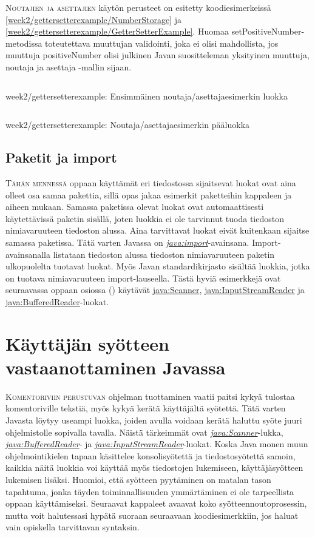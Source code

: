 \documentclass[openany]{book}
\newcommand{\newthought}[1]{\smallskip\textsc{#1}}
\newcommand{\java}[1]{\underline{\gls{java:#1}}}
\newcommand{\newjava}[1]{\textit{\java{#1}}}
\newcommand{\code}[3]{
	\begin{listing}
		\linespread{0.85}
		\inputminted{java}{OhjelmointiopasEsimerkit/src/#1/#2.java}
		\caption{#1: #3}
		\label{#1/#2}
	\end{listing}
}
\begin{document}
\newthought{Noutajien ja asettajien} käytön perusteet on esitetty koodiesimerkeissä
\ref{week2/gettersetterexample/NumberStorage} ja
\ref{week2/gettersetterexample/GetterSetterExample}. Huomaa setPositiveNumber-metodissa
toteutettava muuttujan validointi, joka ei olisi mahdollista, jos muuttuja positiveNumber olisi
julkinen Javan suositteleman yksityinen muuttuja, noutaja ja asettaja -mallin sijaan.

\code{week2/gettersetterexample}{NumberStorage}{Ensimmäinen noutaja/asettajaesimerkin luokka}
\code{week2/gettersetterexample}{GetterSetterExample}{Noutaja/asettajaesimerkin pääluokka}

\subsection{Paketit ja import}
\label{import}

\newthought{Tähän mennessä} oppaan käyttämät eri tiedostossa sijaitsevat luokat ovat aina olleet
osa samaa pakettia, sillä opas jakaa esimerkit paketteihin kappaleen ja aiheen mukaan. Samassa
paketissa olevat luokat ovat automaattisesti käytettävissä paketin sisällä, joten luokkia ei ole
tarvinnut tuoda tiedoston nimiavaruuteen tiedoston alussa. Aina tarvittavat luokat eivät
kuitenkaan sijaitse samassa paketissa. Tätä varten Javassa on \newjava{import}-avainsana.
Import-avainsanalla listataan tiedoston alussa tiedoston nimiavaruuteen paketin ulkopuolelta
tuotavat luokat. Myös Javan standardikirjasto sisältää luokkia, jotka on tuotava nimiavaruuteen
import-lauseella. Tästä hyviä esimerkkejä ovat seuraavassa oppaan osiossa ()
käytävät \java{Scanner}, \java{InputStreamReader} ja \java{BufferedReader}-luokat.


\section{Käyttäjän syötteen vastaanottaminen Javassa}
\label{input}

\newthought{Komentoriviin perustuvan} ohjelman tuottaminen vaatii paitsi kykyä tulostaa
komentoriville tekstiä, myös kykyä kerätä käyttäjältä syötettä. Tätä varten Javasta löytyy
useampi luokka, joiden avulla voidaan kerätä haluttu syöte juuri ohjelmistolle sopivalla tavalla.
Näistä tärkeimmät ovat \newjava{Scanner}-lukka, \newjava{BufferedReader}- ja
\newjava{InputStreamReader}-luokat. Koska Java monen muun ohjelmointikielen tapaan käsittelee
konsolisyötettä ja tiedostosyötettä samoin, kaikkia näitä luokkia voi käyttää myös tiedostojen
lukemiseen, käyttäjäsyötteen lukemisen lisäksi. Huomioi, että syötteen pyytäminen on matalan
tason tapahtuma, jonka täyden toiminnallisuuden ymmärtäminen ei ole tarpeellista oppaan
käyttämiseksi. Seuraavat kappaleet avaavat koko syötteennoutoprosessin, mutta voit halutessasi
hypätä suoraan seuraavaan koodiesimerkkiin, jos haluat vain opiskella tarvittavan syntaksin.
\end{document}
